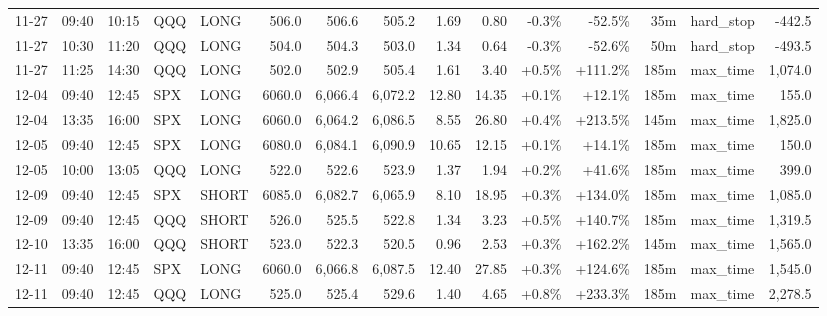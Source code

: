 \documentclass[11pt,a4paper,twoside]{article}
\begin{document}
\begin{landscape}
\begin{center}
\begin{longtable}{>{\color{txtmain}}l l l l l r r r r r r r r >{\color{txtmain}}l r}
11-27 & 09:40 & 10:15 & QQQ & LONG & 506.0 & 506.6 & 505.2 & 1.69 & 0.80 & \textcolor{lossred}{-0.3\%} & \textcolor{lossred}{-52.5\%} & 35m & hard\_stop & \textcolor{lossred}{-442.5} \\
11-27 & 10:30 & 11:20 & QQQ & LONG & 504.0 & 504.3 & 503.0 & 1.34 & 0.64 & \textcolor{lossred}{-0.3\%} & \textcolor{lossred}{-52.6\%} & 50m & hard\_stop & \textcolor{lossred}{-493.5} \\
11-27 & 11:25 & 14:30 & QQQ & LONG & 502.0 & 502.9 & 505.4 & 1.61 & 3.40 & \textcolor{wingreen}{+0.5\%} & \textcolor{wingreen}{+111.2\%} & 185m & max\_time & \textcolor{wingreen}{1,074.0} \\
12-04 & 09:40 & 12:45 & SPX & LONG & 6060.0 & 6,066.4 & 6,072.2 & 12.80 & 14.35 & \textcolor{wingreen}{+0.1\%} & \textcolor{wingreen}{+12.1\%} & 185m & max\_time & \textcolor{wingreen}{155.0} \\
12-04 & 13:35 & 16:00 & SPX & LONG & 6060.0 & 6,064.2 & 6,086.5 & 8.55 & 26.80 & \textcolor{wingreen}{+0.4\%} & \textcolor{wingreen}{+213.5\%} & 145m & max\_time & \textcolor{wingreen}{1,825.0} \\
12-05 & 09:40 & 12:45 & SPX & LONG & 6080.0 & 6,084.1 & 6,090.9 & 10.65 & 12.15 & \textcolor{wingreen}{+0.1\%} & \textcolor{wingreen}{+14.1\%} & 185m & max\_time & \textcolor{wingreen}{150.0} \\
12-05 & 10:00 & 13:05 & QQQ & LONG & 522.0 & 522.6 & 523.9 & 1.37 & 1.94 & \textcolor{wingreen}{+0.2\%} & \textcolor{wingreen}{+41.6\%} & 185m & max\_time & \textcolor{wingreen}{399.0} \\
12-09 & 09:40 & 12:45 & SPX & SHORT & 6085.0 & 6,082.7 & 6,065.9 & 8.10 & 18.95 & \textcolor{wingreen}{+0.3\%} & \textcolor{wingreen}{+134.0\%} & 185m & max\_time & \textcolor{wingreen}{1,085.0} \\
12-09 & 09:40 & 12:45 & QQQ & SHORT & 526.0 & 525.5 & 522.8 & 1.34 & 3.23 & \textcolor{wingreen}{+0.5\%} & \textcolor{wingreen}{+140.7\%} & 185m & max\_time & \textcolor{wingreen}{1,319.5} \\
12-10 & 13:35 & 16:00 & QQQ & SHORT & 523.0 & 522.3 & 520.5 & 0.96 & 2.53 & \textcolor{wingreen}{+0.3\%} & \textcolor{wingreen}{+162.2\%} & 145m & max\_time & \textcolor{wingreen}{1,565.0} \\
12-11 & 09:40 & 12:45 & SPX & LONG & 6060.0 & 6,066.8 & 6,087.5 & 12.40 & 27.85 & \textcolor{wingreen}{+0.3\%} & \textcolor{wingreen}{+124.6\%} & 185m & max\_time & \textcolor{wingreen}{1,545.0} \\
12-11 & 09:40 & 12:45 & QQQ & LONG & 525.0 & 525.4 & 529.6 & 1.40 & 4.65 & \textcolor{wingreen}{+0.8\%} & \textcolor{wingreen}{+233.3\%} & 185m & max\_time & \textcolor{wingreen}{2,278.5} \\

\end{longtable}
\end{center}
\end{landscape}
\end{document}
